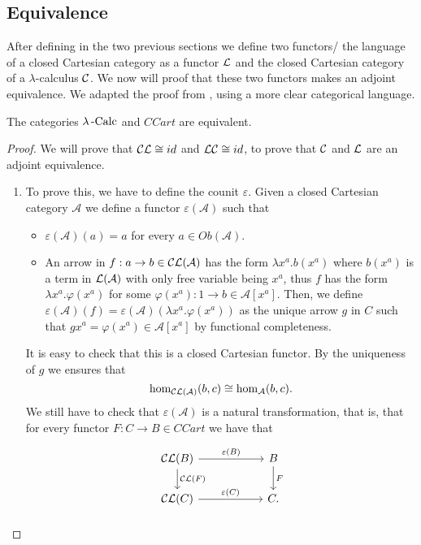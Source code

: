 \subsection{Equivalence}
After defining in the two previous sections we define two functors/ the language of a closed Cartesian category as a functor $\mathcal{L}$ and the closed Cartesian category of a $\lambda$-calculus $\mathcal{C}$. We now will proof that these two functors makes an adjoint equivalence. We adapted the proof from \cite[Theorem 11.3]{lambek1988introduction}, using a more clear categorical language. 


\begin{theorem}The categories $\lambda\operatorname{-Calc}$ and $CCart$ are equivalent. \end{theorem}
\begin{proof}
  We will prove that $\mathcal{C} \mathcal{L} \cong id$ and  $ \mathcal{L}\mathcal{C} \cong id$, to prove that $\mathcal{C}$ and $\mathcal{L}$ are an adjoint equivalence.

  \begin{enumerate}
  \item[\fbox{$\CC \LL \cong 1_{\mathcal A}$}] To prove this, we have to define the counit $\varepsilon$. Given a closed Cartesian category $\mathcal A$ we define a functor  $\varepsilon(\mathcal A)$ such that
    \begin{itemize}
    \item $\varepsilon(\mathcal A)    (a) = a$ for every $a\in Ob(\mathcal A)$.
    \item An arrow in $f:a\to b \in \mathcal{C} \mathcal{L}(\mathcal A)$ has the form $\lambda x^a. b(x^a)$ where $b(x^a)$ is a term in $\mathcal{L} (\mathcal A)$ with only free variable being $x^a$, thus $f$ has the form $\lambda x^a. \varphi(x^a)$ for some $\varphi(x^a): 1 \to b \in \mathcal A [x^a]$. Then, we define $\varepsilon(\mathcal A)(f) = \varepsilon(\mathcal A)(\lambda x^a.\varphi(x^a))$ as the unique arrow $g$ in $C$ such that $gx^a = \varphi(x^a) \in \mathcal A[x^a]$ by functional completeness.
    \end{itemize}
    It is easy to check that this is a closed Cartesian functor.  By the uniqueness of $g$ we ensures that $$\operatorname{hom}_{\mathcal{C}\mathcal{L}(\mathcal A)} (b,c)\cong \operatorname{hom}_{\mathcal A} (b,c).$$
    We still have to check that $\varepsilon (\mathcal A)$ is a natural transformation, that is, that for every functor $F: C\to B\in CCart$ we have that
    \[
      \begin{tikzpicture}
        \node {\begin{tikzcd}[column sep=20mm]
            \CC\LL(B)\ar[r,"\varepsilon(B)"]\ar[d,"\CC\LL(F)"] & B\ar[d,"F"]\\
            \CC\LL(C)\ar[r,"\varepsilon(C)"] & C.
          \end{tikzcd}};
      \end{tikzpicture}
    \]


\end{enumerate}
\end{proof}
